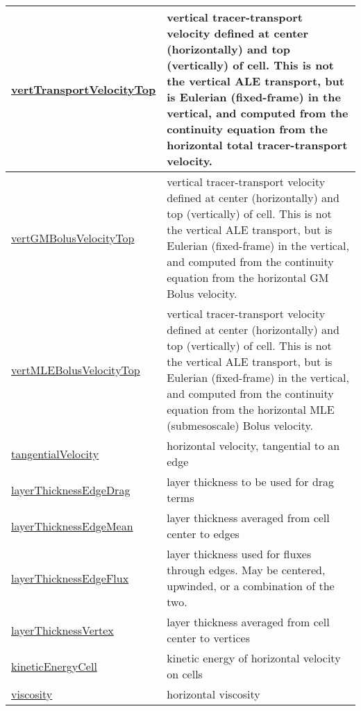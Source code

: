 {\begin{center}
\begin{longtable}{| p{2.0in} | p{4.0in} |}
    \hline
    \hyperref[subsec:var_sec_diagnostics_vertTransportVelocityTop]{vertTransportVelocityTop} & vertical tracer-transport velocity defined at center (horizontally) and top (vertically) of cell.  This is not the vertical ALE transport, but is Eulerian (fixed-frame) in the vertical, and computed from the continuity equation from the horizontal total tracer-transport velocity. \\
    \hline
    \hyperref[subsec:var_sec_diagnostics_vertGMBolusVelocityTop]{vertGMBolusVelocityTop} & vertical tracer-transport velocity defined at center (horizontally) and top (vertically) of cell.  This is not the vertical ALE transport, but is Eulerian (fixed-frame) in the vertical, and computed from the continuity equation from the horizontal GM Bolus velocity. \\
    \hline
    \hyperref[subsec:var_sec_diagnostics_vertMLEBolusVelocityTop]{vertMLEBolusVelocityTop} & vertical tracer-transport velocity defined at center (horizontally) and top (vertically) of cell.  This is not the vertical ALE transport, but is Eulerian (fixed-frame) in the vertical, and computed from the continuity equation from the horizontal MLE (submesoscale) Bolus velocity. \\
    \hline
    \hyperref[subsec:var_sec_diagnostics_tangentialVelocity]{tangentialVelocity} & horizontal velocity, tangential to an edge \\
    \hline
    \hyperref[subsec:var_sec_diagnostics_layerThicknessEdgeDrag]{layerThicknessEdgeDrag} & layer thickness to be used for drag terms \\
    \hline
    \hyperref[subsec:var_sec_diagnostics_layerThicknessEdgeMean]{layerThicknessEdgeMean} & layer thickness averaged from cell center to edges \\
    \hline
    \hyperref[subsec:var_sec_diagnostics_layerThicknessEdgeFlux]{layerThicknessEdgeFlux} & layer thickness used for fluxes through edges. May be centered, upwinded, or a combination of the two. \\
    \hline
    \hyperref[subsec:var_sec_diagnostics_layerThicknessVertex]{layerThicknessVertex} & layer thickness averaged from cell center to vertices \\
    \hline
    \hyperref[subsec:var_sec_diagnostics_kineticEnergyCell]{kineticEnergyCell} & kinetic energy of horizontal velocity on cells \\
    \hline
    \hyperref[subsec:var_sec_diagnostics_viscosity]{viscosity} & horizontal viscosity \\

\end{longtable}
\end{center}}

